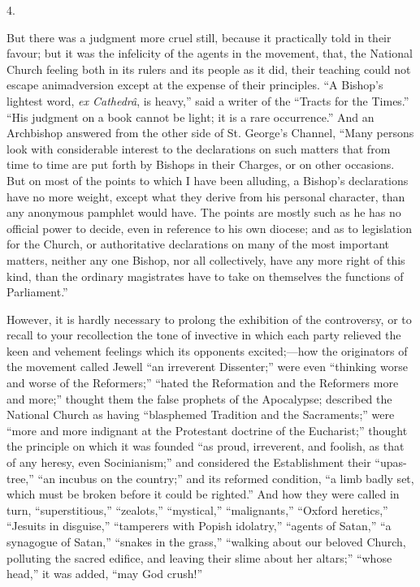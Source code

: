 4.

But there was a judgment more cruel still, because it practically
told in their favour; but it was the infelicity of the agents in the
movement, that, the National Church feeling both in its rulers and its
people as it did, their teaching could not escape animadversion except
at the expense of their principles. ``A Bishop's lightest word, \emph{ex
Cathedrâ}, is heavy,'' said a writer of the ``Tracts for
the Times.'' ``His judgment on a book cannot be light; it is a
rare occurrence.'' And an Archbishop answered from the other side
of St. George's Channel, ``Many persons look with considerable
interest to the declarations on such matters that from time to time
are put forth by Bishops in their Charges, or on other occasions. But
on most of the points to which I have been alluding, a Bishop's
declarations have no more weight, except what they derive from his
personal character, than any anonymous pamphlet would have. The points
are mostly such as he has no official power to decide, even in
reference to his own diocese; and as to legislation for the Church, or
authoritative declarations on many of the most important matters,
neither any one Bishop, nor all collectively, have any more right of
this kind, than the ordinary magistrates have to take on themselves
the functions of Parliament.''

However, it is hardly necessary to prolong the exhibition of the
controversy, or to recall to your recollection the tone of invective
in which each party relieved the keen and vehement feelings which its
opponents excited;—how the originators of the movement called Jewell
``an irreverent Dissenter;'' were even ``thinking worse
and worse of the Reformers;'' ``hated the Reformation and the
Reformers more and more;'' thought them the false prophets of the
Apocalypse; described the National Church as having ``blasphemed
Tradition and the Sacraments;'' were ``more and more indignant
at the Protestant doctrine of the Eucharist;'' thought the
principle on which it was founded ``as proud, irreverent, and
foolish, as that of any heresy, even Socinianism;'' and considered
the Establishment their ``upas-tree,'' ``an incubus on the
country;'' and its reformed condition, ``a limb badly set,
which must be broken before it could be righted.'' And how they
were called in turn, ``superstitious,'' ``zealots,''
``mystical,'' ``malignants,'' ``Oxford
heretics,'' ``Jesuits in disguise,'' ``tamperers with
Popish idolatry,'' ``agents of Satan,'' ``a synagogue
of Satan,'' ``snakes in the grass,'' ``walking about
our beloved Church, polluting the sacred edifice, and leaving their
slime about her altars;'' ``whose head,'' it was added,
``may God crush!''

